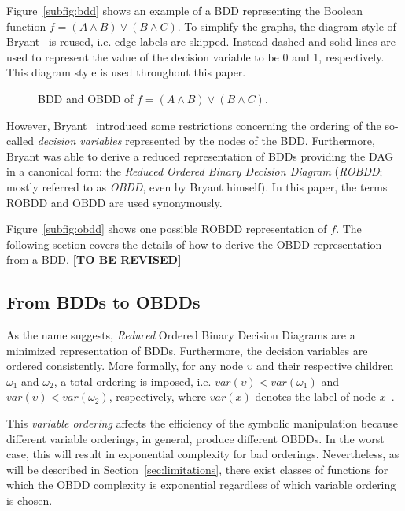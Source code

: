 \documentclass{vldb}
\newcommand{\tbr}{\textbf{[TO BE REVISED]}}
\begin{document}
Figure~\ref{subfig:bdd} shows an example of a BDD representing the Boolean function
$f=(A \land B) \lor (B \land C)$. To simplify the graphs, the diagram style of
Bryant~\cite{BRYANT92} is reused, i.e. edge labels are skipped. Instead dashed
and solid lines are used to represent the value of the decision variable to be 0
and 1, respectively. This diagram style is used throughout this paper.

\begin{figure}[ht]
    \centering
    \subfigure[BDD]{
        
        \label{subfig:bdd}
    }
    \hskip1cm
    \subfigure[OBDD]{
        
        \label{subfig:obdd}
    }
    \caption{BDD and OBDD of $f=(A \land B) \lor (B \land C)$.}
    \label{fig:bdd-and-obdd}
\end{figure}

However, Bryant~\cite{BRYANT86} introduced some restrictions concerning the
ordering of the so-called \textit{decision variables} represented by the nodes
of the BDD. Furthermore, Bryant\cite{BRYANT86} was able to derive a reduced
representation of BDDs providing the DAG in a canonical form: the
\textit{Reduced Ordered Binary Decision Diagram} (\textit{ROBDD}; mostly referred
to as \textit{OBDD}, even by Bryant himself). In this paper, the terms ROBDD and
OBDD are used synonymously.

Figure~\ref{subfig:obdd} shows one possible ROBDD representation of
$f$. The following section covers the details of how
to derive the OBDD representation from a BDD. \tbr

\subsection{From BDDs to OBDDs}
\label{subsec:from-bdds-to-obdds}

As the name suggests, \textit{Reduced} Ordered Binary Decision Diagrams are a 
minimized representation of BDDs. Furthermore, the decision variables are ordered
consistently. More formally, for any node $\upsilon$ and their respective children
$\omega_1$ and $\omega_2$, a total ordering is imposed, i.e.
$var(\upsilon) < var(\omega_1)$ and $var(\upsilon) < var(\omega_2)$, respectively,
where $var(x)$ denotes the label of node $x$~\cite{BRYANT86, BRYANT92}.

This \textit{variable ordering} affects the efficiency of the symbolic
manipulation because different variable orderings, in general, produce different
OBDDs. In the worst case, this will result in exponential complexity for bad
orderings. Nevertheless, as will be described in Section~\ref{sec:limitations},
there exist classes of functions for which the OBDD complexity is exponential
regardless of which variable ordering is chosen.
\end{document}
